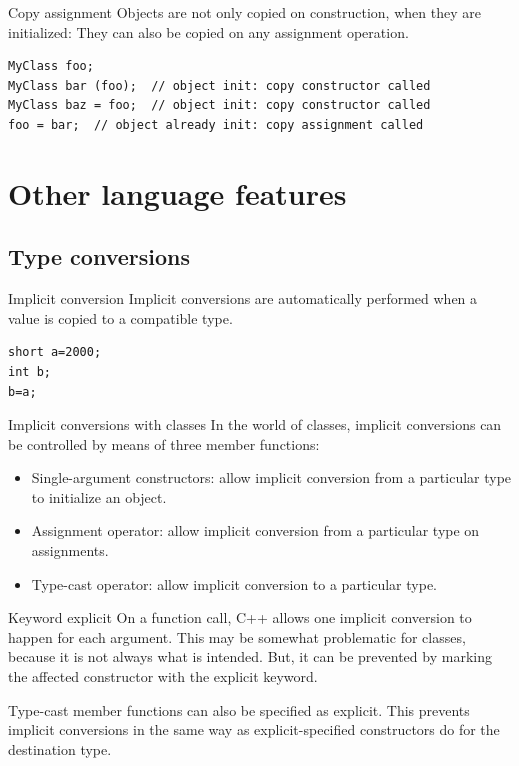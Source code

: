 \documentclass{beamer}
\begin{document}
\begin{frame}[fragile]{Copy assignment}
Objects are not only copied on construction, when they are initialized: They can
also be copied on any assignment operation.
\begin{lstlisting}
MyClass foo;
MyClass bar (foo);  // object init: copy constructor called
MyClass baz = foo;  // object init: copy constructor called
foo = bar;  // object already init: copy assignment called
\end{lstlisting}
\end{frame}

\section{Other language features}
\subsection{Type conversions}
\begin{frame}[fragile]{Implicit conversion}
Implicit conversions are automatically performed when a value is copied to a
compatible type.
\begin{lstlisting}
short a=2000;
int b;
b=a;
\end{lstlisting}
\end{frame}

\begin{frame}{Implicit conversions with classes}
In the world of classes, implicit conversions can be controlled by means of three member functions:
\begin{itemize}
  \item Single-argument constructors: allow implicit conversion from a
  particular type to initialize an object.
  \item Assignment operator: allow implicit conversion from a particular type on
  assignments.
  \item Type-cast operator: allow implicit conversion to a particular type.
\end{itemize}
\end{frame}

\begin{frame}{Keyword explicit}
On a function call, C++ allows one implicit conversion to happen for each
argument. This may be somewhat problematic for classes, because it is not always
what is intended. But, it can be prevented by marking the affected constructor
with the explicit keyword.

Type-cast member functions can also be specified as explicit. This prevents
implicit conversions in the same way as explicit-specified constructors do for
the destination type.
\end{frame}
\end{document}
